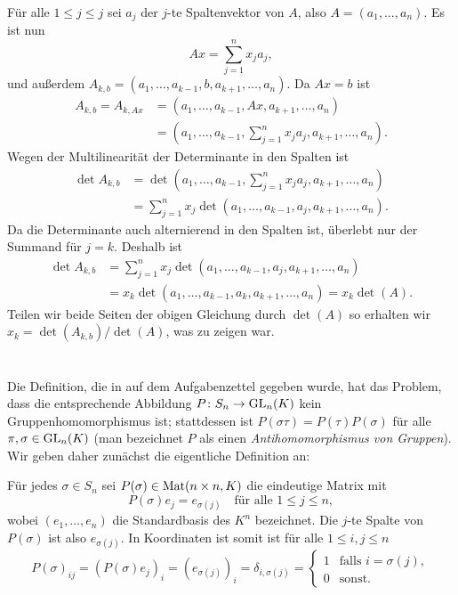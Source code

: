 \documentclass[a4paper,10pt]{article}
\begin{document}
Für alle $1 \leq j \leq j$ sei $a_j$ der $j$-te Spaltenvektor von $A$, also $A = (a_1, \dotsc, a_n)$. Es ist nun
\[
 Ax = \sum_{j=1}^n x_j a_j,
\]
und außerdem $A_{k,b} = (a_1, \dotsc, a_{k-1}, b, a_{k+1}, \dotsc, a_n)$. Da $Ax = b$ ist
\begin{align*}
 A_{k,b}
 = A_{k,Ax}
 &= (a_1, \dotsc, a_{k-1}, Ax, a_{k+1}, \dotsc, a_n) \\
 &= \left( a_1, \dotsc, a_{k-1}, \sum_{j=1}^n x_j a_j, a_{k+1}, \dotsc, a_n \right).
\end{align*}
Wegen der Multilinearität der Determinante in den Spalten ist
\begin{align*}
 \det A_{k,b}
 &= \det \left( a_1, \dotsc, a_{k-1}, \sum_{j=1}^n x_j a_j, a_{k+1}, \dotsc, a_n \right) \\
 &= \sum_{j=1}^n x_j \det \left( a_1, \dotsc, a_{k-1}, a_j, a_{k+1}, \dotsc, a_n \right).
\end{align*}
Da die Determinante auch alternierend in den Spalten ist, überlebt nur der Summand für $j = k$. Deshalb ist
\begin{align*}
 \det A_{k,b}
 &= \sum_{j=1}^n x_j \det \left( a_1, \dotsc, a_{k-1}, a_j, a_{k+1}, \dotsc, a_n \right) \\
 &= x_k \det \left( a_1, \dotsc, a_{k-1}, a_k, a_{k+1}, \dotsc, a_n \right)
 = x_k \det(A).
\end{align*}
Teilen wir beide Seiten der obigen Gleichung durch $\det(A)$ so erhalten wir $x_k = \det(A_{k,b})/\det(A)$, was zu zeigen war.





\section{}
Die Definition, die in auf dem Aufgabenzettel gegeben wurde, hat das Problem, dass die entsprechende Abbildung $P \colon S_n \to \mathrm{GL}_n(K)$ kein Gruppenhomomorphismus ist; stattdessen ist $P(\sigma \tau) = P(\tau) P(\sigma)$ für alle $\pi, \sigma \in \mathrm{GL}_n(K)$ (man bezeichnet $P$ als einen \emph{Antihomomorphismus von Gruppen}). Wir geben daher zunächst die eigentliche Definition an:

Für jedes $\sigma \in S_n$ sei $P(\sigma) \in \mathrm{Mat}(n \times n, K)$ die eindeutige Matrix mit
\[
 P(\sigma) e_j = e_{\sigma(j)}
 \quad\text{für alle $1 \leq j \leq n$},
\]
wobei $(e_1, \dotsc, e_n)$ die Standardbasis des $K^n$ bezeichnet. Die $j$-te Spalte von $P(\sigma)$ ist also $e_{\sigma(j)}$. In Koordinaten ist somit ist für alle $1 \leq i,j \leq n$
\[
 P(\sigma)_{ij}
 = (P(\sigma)e_j)_i
 = (e_{\sigma(j)})_i
 = \delta_{i,\sigma(j)}
 =
 \begin{cases}
  1 & \text{falls $i = \sigma(j)$}, \\
  0 & \text{sonst}.
 \end{cases}
\]
\end{document}

